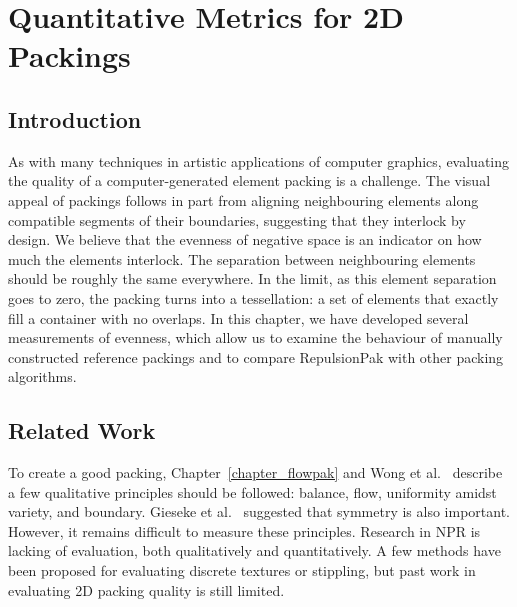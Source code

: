 
\chapter{Quantitative Metrics for 2D Packings}
\label{chapter_qualitative_metrics}


\section{Introduction}


\newtext
{
As with many techniques in artistic applications of computer graphics, evaluating the
quality of a computer-generated element packing is a challenge.
The visual appeal of packings follows in part from aligning neighbouring elements along compatible 
segments of their boundaries, suggesting that they interlock by design. 
We believe that the evenness of negative space is an indicator 
on how much the elements interlock.
The separation between neighbouring elements should be roughly the same everywhere.
In the limit, as this element separation goes to zero,
the packing turns into a tessellation: a set of elements that exactly
fill a container with no overlaps.  
In this chapter, we have developed several measurements of evenness,
which allow us to examine the behaviour of manually constructed reference
packings and to compare RepulsionPak with other packing algorithms.
}

\section{Related Work}


\newtext
{
To create a good packing, Chapter~\ref{chapter_flowpak} and Wong et al.~\cite{Wong1998} describe
a few qualitative principles should be followed: balance, flow, uniformity amidst variety, and boundary.
Gieseke et al.~\cite{Gieseke2017} suggested that symmetry is also important.
However, it remains difficult to measure these principles.
Research in NPR is lacking of evaluation, both qualitatively and quantitatively.
A few methods have been proposed for evaluating discrete textures or stippling,
but past work in evaluating 2D packing quality is still limited.
}


